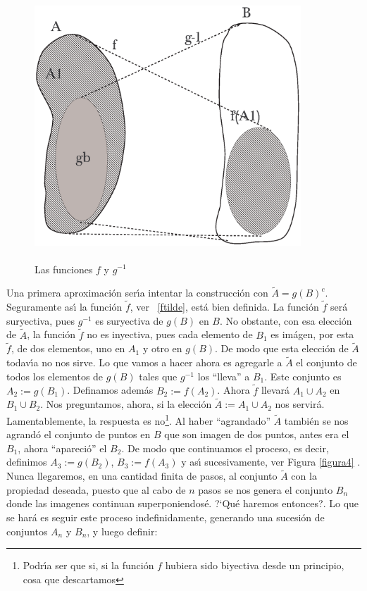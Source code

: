 \begin{figure}[h]


\begin{center}

\includegraphics[height=10cm, width=10cm]{supfyg.eps}

\end{center}

 \caption{Las funciones $f$ y $g^{-1}$}\label{figura3}
\end{figure}

Una primera aproximaci\'on ser\'{\i}a intentar la construcci\'on
con $\tilde{A}=g(B)^c$. Seguramente as\'{\i} la funci\'on
$\tilde{f}$, ver ~\eqref{ftilde}, est\'a bien definida. La
funci\'on $\tilde{f}$ ser\'a suryectiva, pues $g^{-1}$ es
suryectiva de $g(B)$ en $B$. No obstante, con esa elecci\'on de
$\tilde{A}$, la funci\'on $\tilde{f}$ no es inyectiva, pues cada
elemento de $B_1$ es im\'agen, por esta $\tilde{f}$, de dos
elementos, uno en $A_1$ y otro en $g(B)$. De modo que esta
elecci\'on de $\tilde{A}$ todav\'{\i}a no nos sirve. Lo que vamos
a hacer ahora es agregarle a $\tilde{A}$ el conjunto de todos los
elementos de $g(B)$ tales que $g^{-1}$ los ``lleva'' a $B_1$. Este
conjunto es $A_2:=g(B_1)$. Definamos adem\'as $B_2:=f(A_2)$. Ahora
$\tilde{f}$ llevar\'a $A_1\cup A_2$ en $B_1\cup B_2$. Nos
preguntamos, ahora, si la elecci\'on $\tilde{A}:=A_1\cup A_2$ nos
servir\'a. Lamentablemente, la respuesta es
no\footnote{Podr\'{\i}a ser que si, si la funci\'on $f$ hubiera
sido biyectiva desde un principio, cosa que descartamos}. Al haber
``agrandado'' $\tilde{A}$ tambi\'en se nos agrand\'o el conjunto
de puntos en $B$ que son imagen de dos puntos, antes era el $B_1$,
ahora ``apareci\'o'' el $B_2$. De modo que continuamos el proceso,
es decir, definimos $A_3:=g(B_2)$, $B_3:=f(A_3)$ y as\'{\i}
sucesivamente, ver Figura \vref{figura4} . Nunca llegaremos, en
una cantidad finita de pasos, al conjunto $\tilde{A}$ con la
propiedad deseada, puesto que al cabo de $n$ pasos se nos genera
el conjunto $B_n$ donde las imagenes continuan superponiendos\'e.
?`Qu\'e haremos entonces?. Lo que se har\'a es seguir este proceso
indefinidamente, generando una sucesi\'on de conjuntos $A_n$ y
$B_n$, y luego definir:

